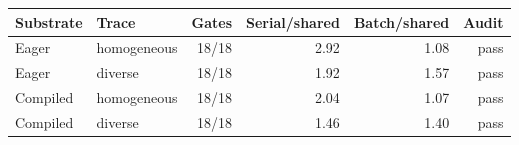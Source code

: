\begin{tabular}{llrrrr}
\toprule
Substrate & Trace & Gates & Serial/shared & Batch/shared & Audit \\
\midrule
Eager & homogeneous & 18/18 & 2.92 & 1.08 & pass \\
Eager & diverse & 18/18 & 1.92 & 1.57 & pass \\
Compiled & homogeneous & 18/18 & 2.04 & 1.07 & pass \\
Compiled & diverse & 18/18 & 1.46 & 1.40 & pass \\
\bottomrule
\end{tabular}
